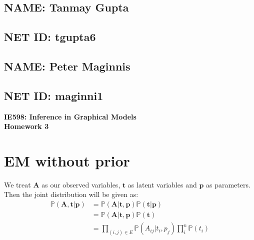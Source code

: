 \documentclass[12pt,onecolumn,letterpaper]{article}
\begin{document}
\begin{minipage}{0.5\textwidth}
\begin{flushleft}
    \subsection*{NAME: Tanmay Gupta}
\end{flushleft}
\end{minipage}
\hfill
\begin{minipage}{0.5\textwidth}
\begin{flushright}
    \subsection*{NET ID: tgupta6}
\end{flushright}
\end{minipage}

\begin{minipage}{0.5\textwidth}
\begin{flushleft}
    \subsection*{NAME: Peter Maginnis}
\end{flushleft}
\end{minipage}
\hfill
\begin{minipage}{0.5\textwidth}
\begin{flushright}
    \subsection*{NET ID: maginni1}
\end{flushright}
\end{minipage}\begin{center}
    \Large\textbf{IE598: Inference in Graphical Models}\\
    \textbf{Homework 3}
\end{center}

\section*{EM without prior}
We treat $\textbf{A}$ as our observed variables, $\textbf{t}$ as latent variables and $\textbf{p}$ as parameters. Then the joint distribution will be given as:
\begin{align*}
\mathbb{P}(\textbf{A},\textbf{t}|\textbf{p}) &= \mathbb{P}(\textbf{A}|\textbf{t},\textbf{p})\mathbb{P}(\textbf{t}|\textbf{p}) \\
&= \mathbb{P}(\textbf{A}|\textbf{t},\textbf{p})\mathbb{P}(\textbf{t}) \tag{Since true labels are independent of worker abilities} \\
&=\prod_{(i,j)\in E}\mathbb{P}(A_{ij}|t_i,p_j)\prod_{i}^{n}\mathbb{P}(t_i) \\
\end{align*}
\end{document}
